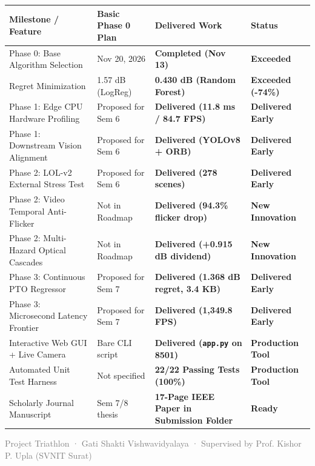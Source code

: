 \documentclass[10pt,a4paper]{article}
\begin{document}
\begin{table}[h!]
\centering
\small
\begin{tabularx}{\textwidth}{p{4.2cm} p{2.8cm} X p{2.2cm}}
\toprule
\textbf{Milestone / Feature} & \textbf{Basic Phase 0 Plan} & \textbf{Delivered Work} & \textbf{Status} \\
\midrule
Phase 0: Base Algorithm Selection & Nov 20, 2026 & \textbf{Completed (Nov 13)} & \textcolor{accentgreen}{\textbf{Exceeded}} \\
Regret Minimization & 1.57 dB (LogReg) & \textbf{0.430 dB (Random Forest)} & \textcolor{accentgreen}{\textbf{Exceeded (-74\%)}} \\
Phase 1: Edge CPU Hardware Profiling & Proposed for Sem 6 & \textbf{Delivered (11.8 ms / 84.7 FPS)} & \textcolor{accentgreen}{\textbf{Delivered Early}} \\
Phase 1: Downstream Vision Alignment & Proposed for Sem 6 & \textbf{Delivered (YOLOv8 + ORB)} & \textcolor{accentgreen}{\textbf{Delivered Early}} \\
Phase 2: LOL-v2 External Stress Test & Proposed for Sem 6 & \textbf{Delivered (278 scenes)} & \textcolor{accentgreen}{\textbf{Delivered Early}} \\
Phase 2: Video Temporal Anti-Flicker & Not in Roadmap & \textbf{Delivered (94.3\% flicker drop)} & \textcolor{accentgreen}{\textbf{New Innovation}} \\
Phase 2: Multi-Hazard Optical Cascades & Not in Roadmap & \textbf{Delivered (+0.915 dB dividend)} & \textcolor{accentgreen}{\textbf{New Innovation}} \\
Phase 3: Continuous PTO Regressor & Proposed for Sem 7 & \textbf{Delivered (1.368 dB regret, 3.4 KB)} & \textcolor{accentgreen}{\textbf{Delivered Early}} \\
Phase 3: Microsecond Latency Frontier & Proposed for Sem 7 & \textbf{Delivered (1,349.8 FPS)} & \textcolor{accentgreen}{\textbf{Delivered Early}} \\
Interactive Web GUI + Live Camera & Bare CLI script & \textbf{Delivered (\texttt{app.py} on 8501)} & \textcolor{accentgreen}{\textbf{Production Tool}} \\
Automated Unit Test Harness & Not specified & \textbf{22/22 Passing Tests (100\%)} & \textcolor{accentgreen}{\textbf{Production Tool}} \\
Scholarly Journal Manuscript & Sem 7/8 thesis & \textbf{17-Page IEEE Paper in Submission Folder} & \textcolor{accentgreen}{\textbf{Ready}} \\
\bottomrule
\end{tabularx}
\end{table}

\vfill
\begin{center}
\small\textcolor{gray}{Project Triathlon · Gati Shakti Vishwavidyalaya · Supervised by Prof. Kishor P. Upla (SVNIT Surat)}
\end{center}
\end{document}
